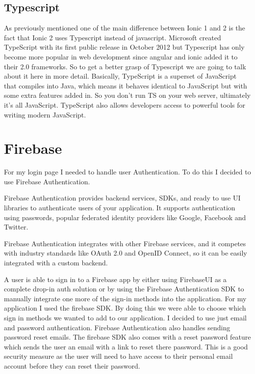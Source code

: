 \subsection {Typescript}
As previously mentioned one of the main difference between Ionic 1 and 2 is the fact that Ionic 2 uses Typescript instead of javascript. Microsoft created TypeScript with its first public release in October 2012 but Typescript has only become more popular in web development since angular and ionic added it to their 2.0 frameworks. So to get a better grasp of Typescript we are going to talk about it here in more detail.
Basically, TypeScript is a superset of JavaScript that compiles into Java, which means it behaves identical to JavaScript but with some extra features added in. So you don't run TS on your web server, ultimately it’s all JavaScript. TypeScript also allows developers access to powerful tools for writing modern JavaScript.\cite{typescript} \cite{typescript2}



\section{Firebase}

For my login page I needed to handle user Authentication. To do this I decided to use Firebase Authentication. 

Firebase Authentication provides backend services, SDKs, and ready to use UI libraries to authenticate users of your application. It supports authentication using passwords, popular federated identity providers like Google, Facebook and Twitter.\cite{firebaseauth}

Firebase Authentication integrates with other Firebase services, and it competes with industry standards like OAuth 2.0 and OpenID Connect, so it can be easily integrated with a custom backend. 

A user is able to sign in to a Firebase app by either using FirebaseUI as a complete drop-in auth solution or by using the Firebase Authentication SDK to manually integrate one more of the  sign-in methods into the application. For my application I used the firebase SDK. By doing this we were able to choose which sign in methods we wanted to add to our application. I decided to use just email and password authentication. 
Firebase Authentication also handles sending password reset emails. The firebase SDK also comes with a reset password feature which sends the user an email with a link to reset there password. This is a good security measure as the user will need to have access to their personal email account before they can reset their password.\cite{firebase}
